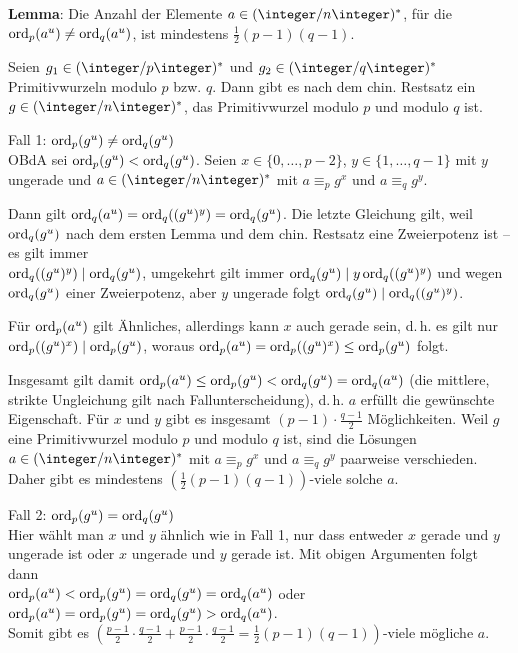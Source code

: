 \linie
\pagebreak

\textbf{Lemma}:
Die Anzahl der Elemente $a \in (\ZnZ)^\ast$, für die $\operatorname{ord}_p(a^u) \not= \operatorname{ord}_q(a^u)$,
ist mindestens $\frac{1}{2} (p-1)(q-1)$.

\begin{Beweis}
    Seien $g_1 \in (\ZpZ)^\ast$ und $g_2 \in (\ZqZ)^\ast$
    Primitivwurzeln modulo $p$ bzw. $q$.
    Dann gibt es nach dem chin. Restsatz ein $g \in (\ZnZ)^\ast$,
    das Primitivwurzel modulo $p$ und modulo $q$ ist.
    
    Fall 1: $\operatorname{ord}_p(g^u) \not= \operatorname{ord}_q(g^u)$\\
    OBdA sei $\operatorname{ord}_p(g^u) < \operatorname{ord}_q(g^u)$.
    Seien $x \in \{0, \dotsc, p - 2\}$, $y \in \{1, \dotsc, q - 1\}$ mit $y$ ungerade und
    $a \in (\ZnZ)^\ast$ mit $a \equiv_p g^x$ und $a \equiv_q g^y$.
    
    Dann gilt $\operatorname{ord}_q(a^u) = \operatorname{ord}_q((g^u)^y) = \operatorname{ord}_q(g^u)$.
    Die letzte Gleichung gilt,
    weil $\operatorname{ord}_q(g^u)$ nach dem ersten Lemma und dem chin. Restsatz eine Zweierpotenz ist --
    es gilt immer\\
    $\operatorname{ord}_q((g^u)^y) \mid \operatorname{ord}_q(g^u)$,
    umgekehrt gilt immer
    $\operatorname{ord}_q(g^u) \mid y \operatorname{ord}_q((g^u)^y)$
    und wegen $\operatorname{ord}_q(g^u)$ einer Zweierpotenz, aber $y$ ungerade folgt
    $\operatorname{ord}_q(g^u) \mid \operatorname{ord}_q((g^u)^y)$.
    
    Für $\operatorname{ord}_p(a^u)$ gilt Ähnliches, allerdings kann $x$ auch gerade sein,
    d.\,h. es gilt nur\\
    $\operatorname{ord}_p((g^u)^x) \mid \operatorname{ord}_p(g^u)$,
    woraus $\operatorname{ord}_p(a^u) = \operatorname{ord}_p((g^u)^x) \le \operatorname{ord}_p(g^u)$ folgt.
    
    Insgesamt gilt damit $\operatorname{ord}_p(a^u) \le \operatorname{ord}_p(g^u) < \operatorname{ord}_q(g^u) = \operatorname{ord}_q(a^u)$
    (die mittlere, strikte Ungleichung gilt nach Fallunterscheidung),
    d.\,h. $a$ erfüllt die gewünschte Eigenschaft.
    Für $x$ und $y$ gibt es insgesamt $(p-1) \cdot \frac{q-1}{2}$ Möglichkeiten.
    Weil $g$ eine Primitivwurzel modulo $p$ und modulo $q$ ist, sind die Lösungen
    $a \in (\ZnZ)^\ast$ mit $a \equiv_p g^x$ und $a \equiv_q g^y$
    paarweise verschieden.
    Daher gibt es mindestens $(\frac{1}{2} (p-1)(q-1))$-viele solche $a$.
    
    Fall 2: $\operatorname{ord}_p(g^u) = \operatorname{ord}_q(g^u)$\\
    Hier wählt man $x$ und $y$ ähnlich wie in Fall 1, nur dass entweder
    $x$ gerade und $y$ ungerade ist oder $x$ ungerade und $y$ gerade ist.
    Mit obigen Argumenten folgt dann\\
    $\operatorname{ord}_p(a^u) < \operatorname{ord}_p(g^u) = \operatorname{ord}_q(g^u) = \operatorname{ord}_q(a^u)$ oder
    $\operatorname{ord}_p(a^u) = \operatorname{ord}_p(g^u) = \operatorname{ord}_q(g^u) > \operatorname{ord}_q(a^u)$.\\
    Somit gibt es $(\frac{p-1}{2} \cdot \frac{q-1}{2} + \frac{p-1}{2} \cdot \frac{q-1}{2}
    = \frac{1}{2} (p-1)(q-1))$-viele mögliche $a$.
\end{Beweis}

